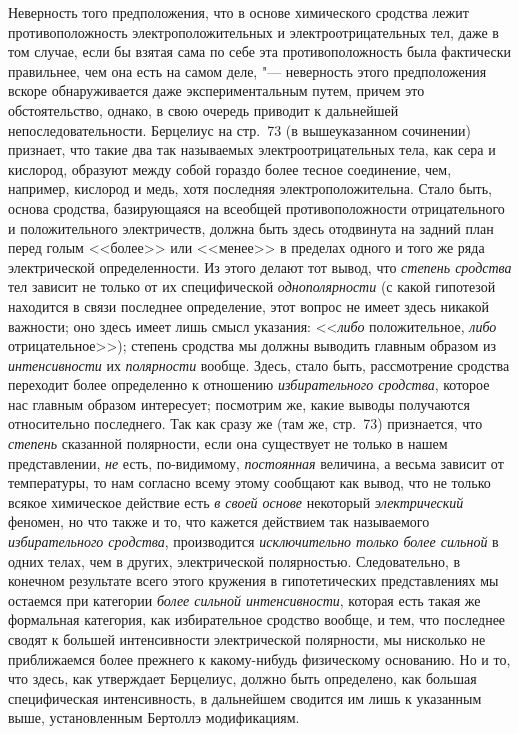 Неверность того предположения, что в основе химического сродства лежит
противоположность электроположительных и электроотрицательных тел, даже в
том случае, если бы взятая сама по себе эта противоположность была
фактически правильнее, чем она есть на самом деле, "--- неверность этого
предположения вскоре обнаруживается даже экспериментальным путем, причем
это обстоятельство, однако, в свою очередь приводит к дальнейшей
непоследовательности. Берцелиус на стр.~73 (в вышеуказанном сочинении)
признает, что такие два так называемых электроотрицательных тела, как сера
и кислород, образуют между собой гораздо более тесное соединение, чем,
например, кислород и медь, хотя последняя электроположительна. Стало быть,
основа сродства, базирующаяся на всеобщей противоположности отрицательного
и положительного электричеств, должна быть здесь отодвинута на задний план
перед голым <<более>> или <<менее>> в пределах одного и того же ряда
электрической определенности. Из этого делают тот вывод, что
{\em степень сродства} тел зависит не только от их
специфической {\em однополярности} (с какой гипотезой
находится в связи последнее определение, этот вопрос не имеет здесь никакой
важности; оно здесь имеет лишь смысл указания: <<{\em либо} положительное,
{\em либо} отрицательное>>); степень сродства мы должны
выводить главным образом из {\em интенсивности} их
{\em полярности} вообще. Здесь, стало быть,
рассмотрение сродства переходит более определенно к отношению
{\em избирательного сродства}, которое нас главным
образом интересует; посмотрим же, какие выводы получаются относительно
последнего. Так как сразу же (там же, стр.~73) признается, что
{\em степень} сказанной полярности, если она существует
не только в нашем представлении, {\em не} есть,
по-видимому, {\em постоянная} величина, а весьма зависит
от температуры, то нам согласно всему этому сообщают как вывод, что не
только всякое химическое действие есть {\em в своей
основе} некоторый {\em электрический} феномен, но что
также и то, что кажется действием так называемого
{\em избирательного сродства}, производится
{\em исключительно только более сильной} в одних телах,
чем в других, электрической полярностью. Следовательно, в конечном
результате всего этого кружения в гипотетических представлениях мы остаемся
при категории {\em более сильной интенсивности},
которая есть такая же формальная категория, как избирательное сродство
вообще, и тем, что последнее сводят к большей интенсивности электрической
полярности, мы нисколько не приближаемся более прежнего к какому-нибудь
физическому основанию. Но и то, что здесь, как утверждает Берцелиус, должно
быть определено, как большая специфическая интенсивность, в дальнейшем
сводится им лишь к указанным выше, установленным Бертоллэ модификациям.

